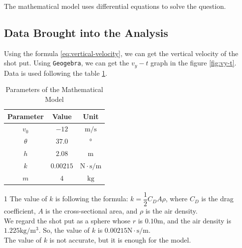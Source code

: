\documentclass{article}
\begin{document}
The mathematical model uses differential equations to solve the question.

\subsection{Data Brought into the Analysis}

Using the formula \ref{eq:vertical-velocity}, we can get the vertical velocity of the shot put. Using \texttt{Geogebra}, we can get the $v_y-t$ graph in the figure \ref{fig:vy-t}. Data is used following the table \ref{table:parameters-data}.

\begin{table}[H]
  \centering
  \begin{threeparttable}
    \begin{tabular}{ccc}
      \hline
      \hspace{1cm}\textbf{Parameter}\hspace{1cm} & \hspace{1cm}\textbf{Value}\hspace{1cm} & \hspace{1cm}\textbf{Unit}\hspace{1cm} \\
      \hline
      $v_0$ & $-12$ & $\si{\meter/\second}$ \\
      $\theta$ & $37.0$ & $\si{\degree}$ \\
      $h$ & $2.08$ & $\si{\meter}$ \\
      $k$ & $0.00215$ \tnote{1} & $\si{\newton\cdot\second/\meter}$ \\
      $m$ & $4$ & $\si{\kilo\gram}$ \\
      \hline
    \end{tabular}
    \begin{tablenotes}
      \item [1] The value of $k$ is following the formula: $k=\dfrac{1}{2}C_DA\rho$, where $C_D$ is the drag coefficient, $A$ is the cross-sectional area, and $\rho$ is the air density. \\
      We regard the shot put as a sphere whose $r$ is $0.10 \si{\meter}$, and the air density is $1.225\si{\kilo\gram/\meter^3}$. So, the value of $k$ is $0.00215\si{\newton\cdot\second/\meter}$. \\
      The value of $k$ is not accurate, but it is enough for the model.
    \end{tablenotes}
  \end{threeparttable}
  \label{table:parameters-data}
  \caption{Parameters of the Mathematical Model}
\end{table}
\end{document}
